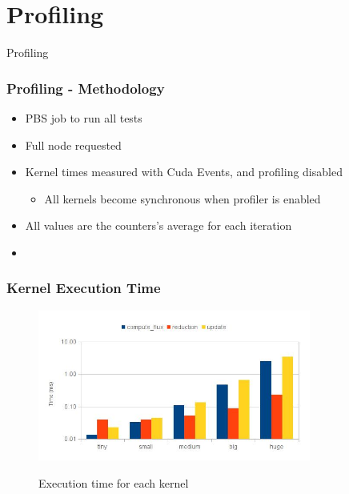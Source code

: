 \documentclass{beamer}
\begin{document}
\section{Profiling}

\begin{frame}
	\begin{center}
		\Huge{Profiling}
	\end{center}
\end{frame}

\begin{frame}
	\frametitle{Profiling - Methodology}

	\begin{itemize}
		\item PBS job to run all tests
		\item Full node requested
		\item Kernel times measured with Cuda Events, and profiling disabled
		\begin{itemize}
			\item[] All kernels become synchronous when profiler is enabled
		\end{itemize}
		\item All values are the counters's average for each iteration
		\item[]
	\end{itemize}

\end{frame}

\begin{frame}
	\frametitle{Kernel Execution Time}

	\begin{figure}[!htp]
		\includegraphics[width=0.8\textwidth]{images/cuda_kernels}
		\label{fig:kernels}
		\caption[Kernel execution time]{Execution time for each kernel}
	\end{figure}
\end{frame}
\end{document}
